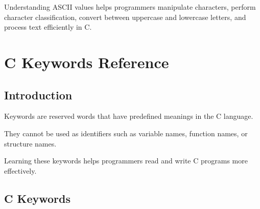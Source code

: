 \documentclass[12pt,openany]{book}
\begin{document}
Understanding ASCII values helps programmers manipulate characters, perform character classification, convert between uppercase and lowercase letters, and process text efficiently in C.
\chapter{C Keywords Reference}

\section{Introduction}

Keywords are reserved words that have predefined meanings in the C language.

They cannot be used as identifiers such as variable names, function names, or structure names.

Learning these keywords helps programmers read and write C programs more effectively.

\section{C Keywords}
\end{document}
